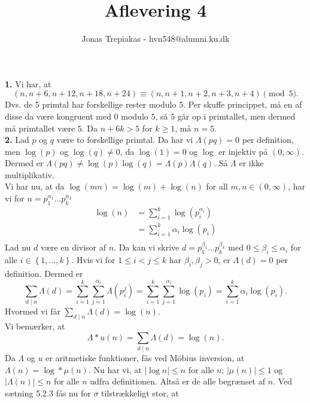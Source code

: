 \documentclass[a4paper]{article}
\title{Aflevering 4}
\author{Jonas Trepiakas - hvn548@alumni.ku.dk}
\date{}
\begin{document}
\maketitle
\newpage
    \textbf{1.} Vi har, at 
     \[
         \left( n, n+6, n+12, n+18, n+24 \right) 
         \equiv \left( n, n+1, n+2, n+3, n+4 \right) \pmod{5}.
    \] 
    Dvs. de 5 primtal har forskellige rester modulo $5$. Per skuffe princippet,
    må en af disse da være kongruent med $0$ modulo $5$, så $5$ går op
    i primtallet, men dermed må primtallet være $5$. Da $n+6k > 5$ for $k\ge
    1$, må $n = 5$.\\
    \linebreak
    \textbf{2.} Lad $p$ og $q$ være to forskellige primtal. Da har vi
    $\Lambda (pq) = 0$ per definition, men
    $\log (p)$ og $\log(q) \neq 0$, da $\log(1)=0$ og $\log$ er injektiv på
    $(0,\infty)$. Dermed er $\Lambda(pq) \neq \log (p) \log(q) = 
    \Lambda(p) \Lambda(q)$. Så $\Lambda$ er ikke multiplikativ.\\
    Vi har nu, at da $\log (mn) = \log (m) + \log(n)$ for all $m,n \in \left(
    0,\infty \right) $, har vi for $n= p_1^{\alpha_1} \ldots p_k^{\alpha_k}$
    \begin{align*}
        \log (n)
        &= \sum_{i=1}^{k} \log \left( p_i^{\alpha_i} \right)\\
        &= \sum_{i=1}^{k} \alpha_i \log\left( p_i \right) \\
    \end{align*}
    Lad nu $d$ være en divisor af $n$. Da kan vi skrive
    $d = p_1^{\beta_1} \ldots p_k^{\beta_k}$ med 
    $0\le \beta_i \le \alpha_i$ for alle $i \in \left\{ 1,\ldots, k \right\} $.
    Hvis vi for $1 \le i < j \le k$ har $\beta_i, \beta_j > 0$, er
    $\Lambda (d) = 0$ per definition. Dermed er
    $$\sum_{d \mid n} \Lambda(d) = 
    \sum_{i=1}^{k} \sum_{j=1}^{\alpha_i} \Lambda(p_i^{j})
    = \sum_{i=1}^{k} \sum_{j=1}^{\alpha_i} \log (p_i)
    = \sum_{i=1}^{k} \alpha_i \log (p_i).$$
    Hvormed vi får $\sum_{d \mid n} \Lambda(d) = \log(n)$.\\
    Vi bemærker, at
    \[
    \Lambda * u (n) = \sum_{d \mid n} \Lambda (d) = \log (n).
    \] 
    Da $\Lambda$ og $u$ er aritmetiske funktioner, fås ved Möbius inversion, at
    $\Lambda (n) = \log * \mu (n)$.
    Nu har vi, at $\left| \log n \right| \le n$ for alle $n$; $\left| \mu(n)
    \right| \le 1$ og $\left| \Lambda (n) \right| \le n$ for alle $n$ udfra
    definitionen. Altså er de alle begrænset af $n$. Ved sætning 5.2.3 fås nu
    for $\sigma $ tilstrækkeligt stor, at
\end{document}
